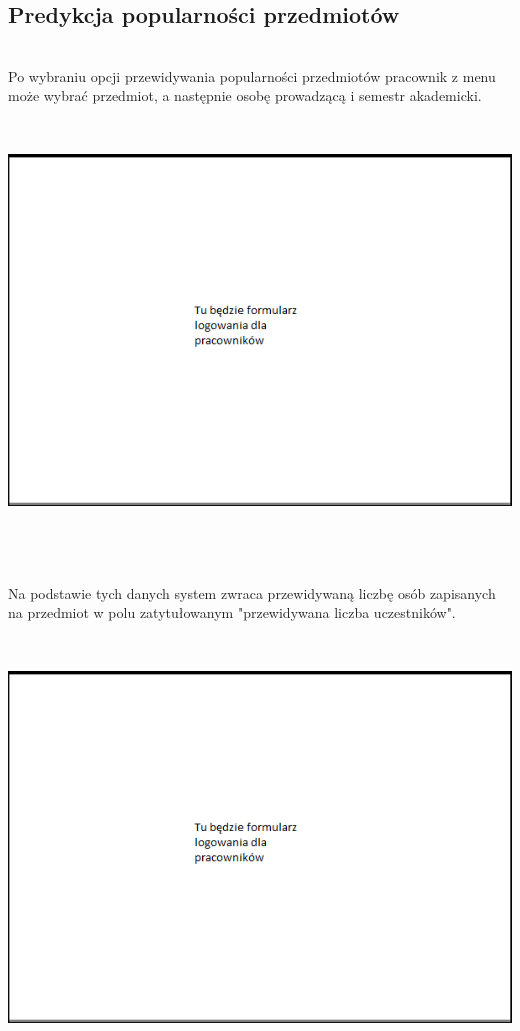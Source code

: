 \documentclass[licencjacka]{pracamgr}
\begin{document}
\subsection{Predykcja popularności przedmiotów} ~\\ \indent
Po wybraniu opcji przewidywania popularności przedmiotów pracownik z menu może wybrać przedmiot, a następnie osobę prowadzącą i semestr akademicki. \par
 ~\\
\begin{minipage}{\linewidth}
	\centering
           \includegraphics[scale=0.7]{logowanieprac.png}
\end{minipage} \\ \\ \\
\indent Na podstawie tych danych system zwraca przewidywaną liczbę osób zapisanych na przedmiot w polu zatytułowanym "przewidywana liczba uczestników". \par
 ~\\
\begin{minipage}{\linewidth}
	\centering
           \includegraphics[scale=0.7]{logowanieprac.png}
\end{minipage} \\ 
 
\end{document}
